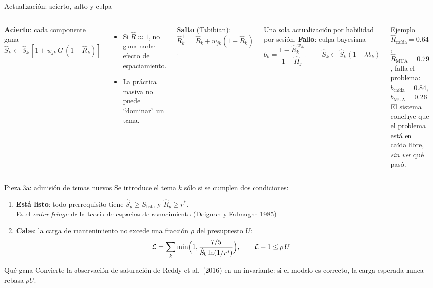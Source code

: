\documentclass[aspectratio=169,11pt]{beamer}
\newcommand{\Rh}{\hat R}
\newcommand{\Sh}{\hat S}
\newcommand{\Pih}{\hat\Pi}
\newcommand{\rstar}{r^{\ast}}
\begin{document}
\begin{frame}{Actualización: acierto, salto y culpa}
\begin{columns}[T]
\textbf{Acierto}: cada componente gana
\[
\Sh_k\leftarrow\Sh_k\,[1+w_{jk}\,G\,(1-\Rh_k)]
\]
\begin{itemize}\small
\item Si $\Rh\approx1$, no gana nada: \alert{efecto de espaciamiento}.
\item La práctica masiva no puede ``dominar'' un tema.
\end{itemize}
\textbf{Salto} (Tabibian): $\Rh_k^+=\Rh_k+w_{jk}(1-\Rh_k)$.

\small Una sola actualización por habilidad por sesión.
\textbf{Fallo}: culpa bayesiana
\[
b_k=\frac{1-\Rh_k^{\,w_{jk}}}{1-\Pih_j},\qquad \Sh_k\leftarrow\Sh_k(1-\lambda b_k)
\]
\begin{exampleblock}{Ejemplo}
\small $\Rh_{\text{caída}}=0.64$, $\Rh_{\text{MUA}}=0.79$, falla el problema:\\[2pt]
$b_{\text{caída}}=0.84$, \quad $b_{\text{MUA}}=0.26$\\[2pt]
El sistema concluye que el problema está en caída libre, \emph{sin ver} qué pasó.
\end{exampleblock}
\end{columns}
\end{frame}

\begin{frame}{Pieza 3a: admisión de temas nuevos}
Se introduce el tema $k$ sólo si se cumplen dos condiciones:
\begin{enumerate}
\item \textbf{Está listo}: todo prerrequisito tiene $\Sh_p\ge S_{\text{listo}}$ y $\Rh_p\ge\rstar$.\\
{\small\color{gris}Es el \emph{outer fringe} de la teoría de espacios de conocimiento (Doignon y Falmagne 1985).}
\item \textbf{Cabe}: la carga de mantenimiento no excede una fracción $\rho$ del presupuesto $U$:
\[
\mathcal L=\sum_k\min\Bigl(1,\frac{7/5}{\Sh_k\ln(1/\rstar)}\Bigr),\qquad \mathcal L+1\le\rho\,U
\]
\end{enumerate}
\begin{block}{Qué gana}
Convierte la observación de saturación de Reddy et al.\ (2016) en un \alert{invariante}: si el modelo es correcto, la carga esperada nunca rebasa $\rho U$.
\end{block}
\end{frame}
\end{document}
